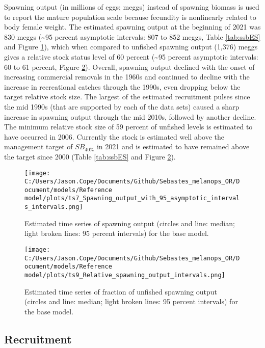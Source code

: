 \documentclass[11pt,
  english,
  letterpaper,
]{article}
\begin{document}
Spawning output (in millions of eggs; meggs) instead of spawning biomass is used to report the mature population scale because fecundity is nonlinearly related to body female weight. The estimated spawning output at the beginning of 2021 was 830 meggs (\textasciitilde95 percent asymptotic intervals: 807 to 852 meggs, Table \ref{tab:ssbES} and Figure \ref{fig:es-ssb}), which when compared to unfished spawning output (1,376) meggs gives a relative stock status level of 60 percent (\textasciitilde95 percent asymptotic intervals: 60 to 61 percent, Figure \ref{fig:es-depl}). Overall, spawning output declined with the onset of increasing commercial removals in the 1960s and continued to decline with the increase in recreational catches through the 1990s, even dropping below the target relative stock size. The largest of the estimated recruitment pulses since the mid 1990s (that are supported by each of the data sets) caused a sharp increase in spawning output through the mid 2010s, followed by another decline. The minimum relative stock size of 59 percent of unfished levels is estimated to have occurred in 2006. Currently the stock is estimated well above the management target of \(SB_{40\%}\) in 2021 and is estimated to have remained above the target since 2000 (Table \ref{tab:ssbES} and Figure \ref{fig:es-depl}).



\begin{figure}
\centering
\texttt{[image: C:/Users/Jason.Cope/Documents/Github/Sebastes\_melanops\_OR/Document/models/Reference model/plots/ts7\_Spawning\_output\_with\_95\_asymptotic\_intervals\_intervals.png]}
\caption{Estimated time series of spawning output (circles and line: median; light broken lines: 95 percent intervals) for the base model.\label{fig:es-ssb}}
\end{figure}

\begin{figure}
\centering
\texttt{[image: C:/Users/Jason.Cope/Documents/Github/Sebastes\_melanops\_OR/Document/models/Reference model/plots/ts9\_Relative\_spawning\_output\_intervals.png]}
\caption{Estimated time series of fraction of unfished spawning output (circles and line: median; light broken lines: 95 percent intervals) for the base model.\label{fig:es-depl}}
\end{figure}

\clearpage

\hypertarget{recruitment}{%
\subsection*{Recruitment}\label{recruitment}}
\end{document}
